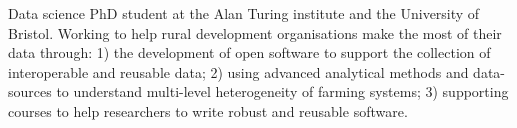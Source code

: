 \documentclass[letter,10pt]{article}
\begin{document}
Data science PhD student at the Alan Turing institute and the 
University of Bristol. Working to help rural development
organisations make the most of their data through: 1) the 
development of open software to support the collection of 
interoperable and reusable data; 2) using advanced analytical 
methods and data-sources to understand multi-level heterogeneity
of farming systems; 3) supporting courses to help 
researchers to write robust and reusable software.
\end{document}
